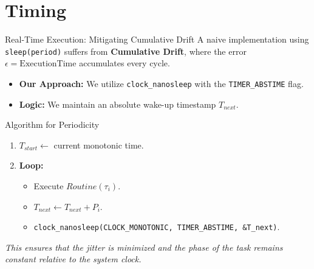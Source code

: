 \section{Timing}
\begin{frame}{Real-Time Execution: Mitigating Cumulative Drift}
    A naive implementation using \texttt{sleep(period)} suffers from \textbf{Cumulative Drift}, where the error $\epsilon = \text{ExecutionTime}$ accumulates every cycle.

    \begin{itemize}
        \item \textbf{Our Approach:} We utilize \texttt{clock\_nanosleep} with the \texttt{TIMER\_ABSTIME} flag.
        \item \textbf{Logic:} We maintain an absolute wake-up timestamp $T_{next}$.
    \end{itemize}

    \begin{block}{Algorithm for Periodicity}
        \begin{enumerate}
            \item $T_{start} \leftarrow$ current monotonic time.
            \item \textbf{Loop:}
            \begin{itemize}
                \item Execute $Routine(\tau_i)$.
                \item $T_{next} \leftarrow T_{next} + P_i$.
                \item \texttt{clock\_nanosleep(CLOCK\_MONOTONIC, TIMER\_ABSTIME, \&T_{next})}.
            \end{itemize}
        \end{enumerate}
    \end{block}
    \textit{This ensures that the jitter is minimized and the phase of the task remains constant relative to the system clock.}
\end{frame}


